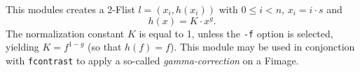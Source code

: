 This modules creates a 2-Flist $l=(x_i,h(x_i))$ with $0\leq i<n$,
$x_i = i\cdot s$ and 
$$h(x) = K\cdot x^g.$$
The normalization constant $K$ is equal to 1, unless the \verb+-f+
option is selected, yielding $K=f^{1-g}$ (so that $h(f)=f$).
This module may be used in conjonction with \verb+fcontrast+ to apply
a so-called {\it gamma-correction} on a Fimage.